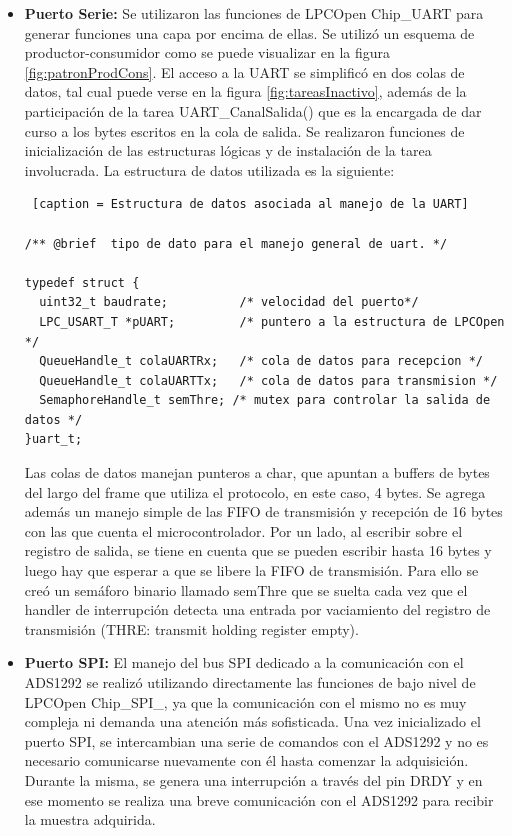 \begin{itemize}

	\item \textbf{Puerto Serie:} Se utilizaron las funciones de LPCOpen Chip\_UART para generar funciones una capa por encima de ellas. Se utilizó un esquema de productor-consumidor como se puede visualizar en la figura \ref{fig:patronProdCons}. El acceso a la UART se simplificó en dos colas de datos, tal cual puede verse en la figura \ref{fig:tareasInactivo}, además de la participación de la tarea UART\_CanalSalida() que es la encargada de dar curso a los bytes escritos en la cola de salida. Se realizaron funciones de inicialización de las estructuras lógicas y de instalación de la tarea involucrada. La estructura de datos utilizada es la siguiente:


\footnotesize 	
\begin{lstlisting} [caption = Estructura de datos asociada al manejo de la UART]

/** @brief  tipo de dato para el manejo general de uart. */

typedef struct {
  uint32_t baudrate;	      /* velocidad del puerto*/
  LPC_USART_T *pUART;		  /* puntero a la estructura de LPCOpen */
  QueueHandle_t colaUARTRx;	  /* cola de datos para recepcion */
  QueueHandle_t colaUARTTx;	  /* cola de datos para transmision */
  SemaphoreHandle_t semThre; /* mutex para controlar la salida de datos */
}uart_t;

\end{lstlisting}	
\normalsize


Las colas de datos manejan punteros a char, que apuntan a buffers de bytes del largo del frame que utiliza el protocolo, en este caso, 4 bytes.
Se agrega además un manejo simple de las FIFO de transmisión y recepción de 16 bytes con las que cuenta el microcontrolador. Por un lado, al escribir sobre el registro de salida, se tiene en cuenta que se pueden escribir hasta 16 bytes y luego hay que esperar a que se libere la FIFO de transmisión. Para ello se creó un semáforo binario llamado semThre que se suelta cada vez que el handler de interrupción detecta una entrada por vaciamiento del registro de transmisión (THRE: transmit holding register empty). 

	\item \textbf{Puerto SPI:} El manejo del bus SPI dedicado a la comunicación con el ADS1292 se realizó utilizando directamente las funciones de bajo nivel de LPCOpen Chip\_SPI\_, ya que la comunicación con el mismo no es muy compleja ni demanda una atención más sofisticada. Una vez inicializado el puerto SPI, se intercambian una serie de comandos con el ADS1292 y no es necesario comunicarse nuevamente con él hasta comenzar la adquisición. Durante la misma, se genera una interrupción a través del pin DRDY y en ese momento se realiza una breve comunicación con el ADS1292 para recibir la muestra adquirida. 
	

\end{itemize}
